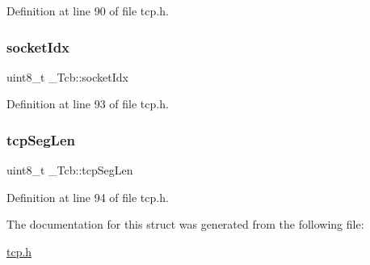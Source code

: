 Definition at line 90 of file tcp.\+h.

\mbox{\label{struct__Tcb_aecc2db02b3ede89fffb9c067c114f0a5}} 
\subsubsection{\texorpdfstring{socket\+Idx}{socketIdx}}
{\footnotesize\ttfamily uint8\+\_\+t \+\_\+\+Tcb\+::socket\+Idx}



Definition at line 93 of file tcp.\+h.

\mbox{\label{struct__Tcb_ab0822736115f712f094a271a5beebe44}} 
\subsubsection{\texorpdfstring{tcp\+Seg\+Len}{tcpSegLen}}
{\footnotesize\ttfamily uint8\+\_\+t \+\_\+\+Tcb\+::tcp\+Seg\+Len}



Definition at line 94 of file tcp.\+h.



The documentation for this struct was generated from the following file\+:\begin{DoxyCompactItemize}
\item 
\hyperlink{tcp_8h}{tcp.\+h}\end{DoxyCompactItemize}
